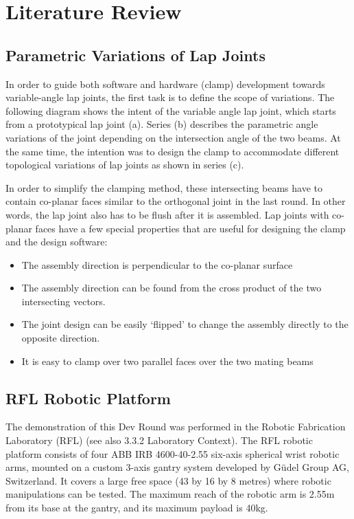 \section{Literature Review}
\subsection{Parametric Variations of Lap Joints}
In order to guide both software and hardware (clamp) development towards variable-angle lap joints, the first task is to define the scope of variations. The following diagram shows the intent of the variable angle lap joint, which starts from a prototypical lap joint (a). Series (b) describes the parametric angle variations of the joint depending on the intersection angle of the two beams. At the same time, the intention was to design the clamp to accommodate different topological variations of lap joints as shown in series (c).

In order to simplify the clamping method, these intersecting beams have to contain co-planar faces similar to the orthogonal joint in the last round. In other words, the lap joint also has to be flush after it is assembled. Lap joints with co-planar faces have a few special properties that are useful for designing the clamp and the design software:

\begin{itemize}
    \item The assembly direction is perpendicular to the co-planar surface
    \item The assembly direction can be found from the cross product of the two intersecting vectors.
    \item The joint design can be easily ‘flipped’ to change the assembly directly to the opposite direction.
    \item It is easy to clamp over two parallel faces over the two mating beams
\end{itemize}

\subsection{RFL Robotic Platform}
The demonstration of this Dev Round was performed in the Robotic Fabrication Laboratory (RFL) (see also 3.3.2 Laboratory Context). The RFL robotic platform consists of four ABB IRB 4600-40-2.55 six-axis spherical wrist robotic arms, mounted on a custom 3-axis gantry system developed by Güdel Group AG, Switzerland. It covers a large free space (43 by 16 by 8 metres) where robotic manipulations can be tested. The maximum reach of the robotic arm is 2.55m from its base at the gantry, and its maximum payload is 40kg.

